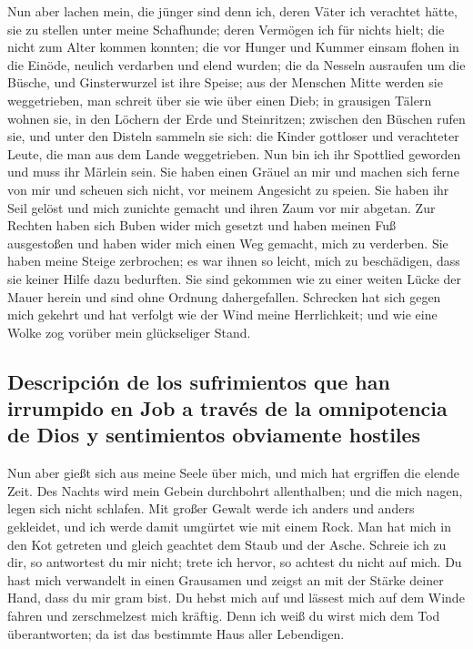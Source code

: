 Nun aber lachen mein, die jünger sind denn ich, deren
Väter ich verachtet hätte, sie zu stellen unter meine Schafhunde;
 deren Vermögen ich für nichts hielt; die nicht zum Alter
kommen konnten;  die vor Hunger und Kummer einsam flohen
in die Einöde, neulich verdarben und elend wurden;  die da
Nesseln ausraufen um die Büsche, und Ginsterwurzel ist ihre Speise;
 aus der Menschen Mitte werden sie weggetrieben, man
schreit über sie wie über einen Dieb;  in grausigen Tälern
wohnen sie, in den Löchern der Erde und Steinritzen; 
zwischen den Büschen rufen sie, und unter den Disteln sammeln sie sich:
 die Kinder gottloser und verachteter Leute, die man aus
dem Lande weggetrieben.  Nun bin ich ihr Spottlied
geworden und muss ihr Märlein sein.  Sie haben einen
Gräuel an mir und machen sich ferne von mir und scheuen sich nicht, vor
meinem Angesicht zu speien.  Sie haben ihr Seil gelöst
und mich zunichte gemacht und ihren Zaum vor mir abgetan.
 Zur Rechten haben sich Buben wider mich gesetzt und
haben meinen Fuß ausgestoßen und haben wider mich einen Weg gemacht,
mich zu verderben.  Sie haben meine Steige zerbrochen; es
war ihnen so leicht, mich zu beschädigen, dass sie keiner Hilfe dazu
bedurften.  Sie sind gekommen wie zu einer weiten Lücke
der Mauer herein und sind ohne Ordnung dahergefallen. 
Schrecken hat sich gegen mich gekehrt und hat verfolgt wie der Wind
meine Herrlichkeit; und wie eine Wolke zog vorüber mein glückseliger
Stand.

\hypertarget{descripciuxf3n-de-los-sufrimientos-que-han-irrumpido-en-job-a-travuxe9s-de-la-omnipotencia-de-dios-y-sentimientos-obviamente-hostiles}{%
\subsection{Descripción de los sufrimientos que han irrumpido en Job a
través de la omnipotencia de Dios y sentimientos obviamente
hostiles}\label{descripciuxf3n-de-los-sufrimientos-que-han-irrumpido-en-job-a-travuxe9s-de-la-omnipotencia-de-dios-y-sentimientos-obviamente-hostiles}}

 Nun aber gießt sich aus meine Seele über mich, und mich
hat ergriffen die elende Zeit.  Des Nachts wird mein
Gebein durchbohrt allenthalben; und die mich nagen, legen sich nicht
schlafen.  Mit großer Gewalt werde ich anders und anders
gekleidet, und ich werde damit umgürtet wie mit einem Rock.
 Man hat mich in den Kot getreten und gleich geachtet dem
Staub und der Asche.  Schreie ich zu dir, so antwortest
du mir nicht; trete ich hervor, so achtest du nicht auf mich.
 Du hast mich verwandelt in einen Grausamen und zeigst an
mit der Stärke deiner Hand, dass du mir gram bist.  Du
hebst mich auf und lässest mich auf dem Winde fahren und zerschmelzest
mich kräftig.  Denn ich weiß du wirst mich dem Tod
überantworten; da ist das bestimmte Haus aller Lebendigen.


